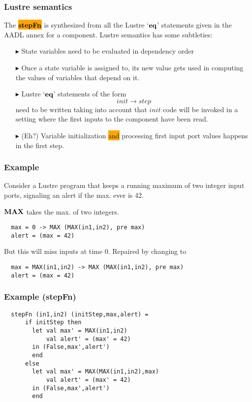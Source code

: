 \documentclass{beamer}
\newcommand{\kemph}[1]{\colorbox{orange}{#1}}
\newcommand{\konst}[1]{\ensuremath{\mbox{\bf{#1}}}}
\begin{document}
\begin{frame}\frametitle{Lustre semantics}

The \kemph{\konst{stepFn}} is synthesized from all the Lustre
`\konst{eq}' statements given in the AADL annex for a
component. Lustre semantics has some subtleties:

\begin{itemize}
\item [$\blacktriangleright$] State variables need to be evaluated in dependency order

\item [$\blacktriangleright$] Once a state variable is assigned to,
  its new value gets used in computing the values of variables that
  depend on it.

\item [$\blacktriangleright$] Lustre `\konst{eq}' statements of the form
\[ \mathit{init} \to \mathit{step}
\]
need to be written taking into account that $\mathit{init}$ code will
be invoked in a setting where the first inputs to the component have been read.

\item [$\blacktriangleright$] (Eh?) Variable initialization \kemph{and}
  processing first input port values happens in the first step.


\end{itemize}

\end{frame}

\begin{frame}[fragile]\frametitle{Example}

Consider a Lustre program that keeps a running maximum of two integer
input ports, signaling an alert if the max. ever is 42.

\konst{MAX} takes the max. of two integers.

{\small
\begin{verbatim}
  max = 0 -> MAX (MAX(in1,in2), pre max)
  alert = (max = 42)
\end{verbatim}
}

But this will miss inputs at time 0. Repaired by changing to

{\small
\begin{verbatim}
  max = MAX(in1,in2) -> MAX (MAX(in1,in2), pre max)
  alert = (max = 42)
\end{verbatim}
}

\end{frame}

\begin{frame}[fragile]\frametitle{Example (stepFn)}

{\small
\begin{verbatim}
  stepFn (in1,in2) (initStep,max,alert) =
      if initStep then
        let val max' = MAX(in1,in2)
            val alert' = (max' = 42)
        in (False,max',alert')
        end
      else
        let val max' = MAX(MAX(in1,in2),max)
            val alert' = (max' = 42)
        in (False,max',alert')
        end
\end{verbatim}
}

\end{frame}
\end{document}
